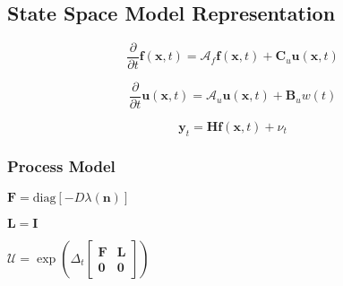 \documentclass[11pt]{article}
\begin{document}
    \begin{center}
    \end{center}
    { \hspace*{\fill} \\}
    
    \begin{center}
    \end{center}
    { \hspace*{\fill} \\}
    
    \begin{center}
    \end{center}
    { \hspace*{\fill} \\}
    
    \begin{center}
    \end{center}
    { \hspace*{\fill} \\}
    
    \subsection{State Space Model
Representation}\label{state-space-model-representation}

\[
    \frac{\partial}{\partial t}\mathbf{f}(\mathbf{x}, t) = \mathscr{A}_f\mathbf{f}(\mathbf{x},t) +  \mathbf{C}_u\mathbf{u}(\mathbf{x},t)
\]

\[
    \frac{\partial}{\partial t}\mathbf{u}(\mathbf{x}, t) = \mathscr{A}_u\mathbf{u}(\mathbf{x},t) + \mathbf{B}_uw(t)
\]

\[
    \mathbf{y}_{t} = \mathbf{H}\mathbf{f}(\mathbf{x},t) + \nu_t
\]

\subsubsection{Process Model}\label{process-model}

\(\mathbf{F} = \mathrm{diag}\left[-D\lambda(\mathbf{n})\right]\)

\(\mathbf{L} = \mathbf{I}\)

\(\mathscr{U} = \exp\left(\Delta_t\begin{bmatrix}\mathbf{F} & \mathbf{L} \\ \mathbf{0} & \mathbf{0}\end{bmatrix}\right)\)
\end{document}
